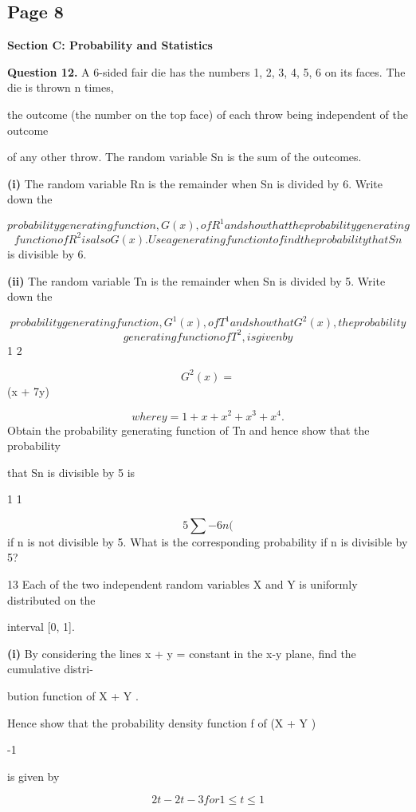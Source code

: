 \documentclass[12pt]{article}
\begin{document}
\subsection*{Page 8}
\begin{flushleft}
\bigskip\textbf{Section C: Probability and Statistics}\par
\bigskip\textbf{Question 12.} A 6-sided fair die has the numbers 1, 2, 3, 4, 5, 6 on its faces. The die is thrown n times,\par
the outcome (the number on the top face) of each throw being independent of the outcome\par
of any other throw. The random variable Sn is the sum of the outcomes.\par
\textbf{(i)} The random variable Rn is the remainder when Sn is divided by 6. Write down the\par
\[probability generating function, G(x), of R^1 and show that the probability generating\]
\[function of R^2 is also G(x). Use a generating function to find the probability that Sn\]
is divisible by 6.\par
\textbf{(ii)} The random variable Tn is the remainder when Sn is divided by 5. Write down the\par
\[probability generating function, G^1(x), of T^1 and show that G^2(x), the probability\]
\[generating function of T^2, is given by\]
1 2\par
\[G^2(x) =\]
(x + 7y)\par
\[where y = 1 + x + x^2 + x^3 + x^4 .\]
Obtain the probability generating function of Tn and hence show that the probability\par
that Sn is divisible by 5 is\par
1 1\par
\[5 \sum - 6n (\]
if n is not divisible by 5. What is the corresponding probability if n is divisible by 5?\par
13 Each of the two independent random variables X and Y is uniformly distributed on the\par
interval [0, 1].\par
\textbf{(i)} By considering the lines x + y = constant in the x-y plane, find the cumulative distri-\par
bution function of X + Y .\par
Hence show that the probability density function f of (X + Y )\par
-1\par
is given by\par
\[2t -2 t -3 for 1 \leq t \leq 1\]

\end{flushleft}
\end{document}
